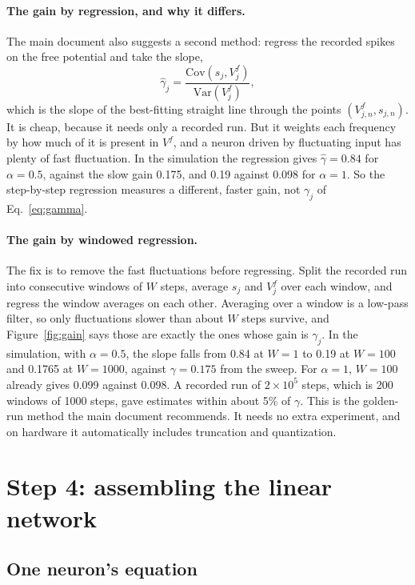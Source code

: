 \documentclass[11pt,a4paper]{article}
\newcommand{\Var}{\mathrm{Var}}
\newcommand{\Cov}{\mathrm{Cov}}
\begin{document}
\paragraph{The gain by regression, and why it differs.} The main document also suggests a second method: regress the recorded spikes on the free potential and take the slope,
\begin{equation*}
\hat\gamma_j = \frac{\Cov(s_j, V^f_j)}{\Var(V^f_j)},
\end{equation*}
which is the slope of the best-fitting straight line through the points $(V^f_{j,n}, s_{j,n})$. It is cheap, because it needs only a recorded run. But it weights each frequency by how much of it is present in $V^f$, and a neuron driven by fluctuating input has plenty of fast fluctuation. In the simulation the regression gives $\hat\gamma = 0.84$ for $\alpha = 0.5$, against the slow gain 0.175, and 0.19 against 0.098 for $\alpha = 1$. So the step-by-step regression measures a different, faster gain, not $\gamma_j$ of Eq.~\eqref{eq:gamma}.

\paragraph{The gain by windowed regression.} The fix is to remove the fast fluctuations before regressing. Split the recorded run into consecutive windows of $W$ steps, average $s_j$ and $V^f_j$ over each window, and regress the window averages on each other. Averaging over a window is a low-pass filter, so only fluctuations slower than about $W$ steps survive, and Figure~\ref{fig:gain} says those are exactly the ones whose gain is $\gamma_j$. In the simulation, with $\alpha = 0.5$, the slope falls from 0.84 at $W = 1$ to 0.19 at $W = 100$ and 0.1765 at $W = 1000$, against $\gamma = 0.175$ from the sweep. For $\alpha = 1$, $W = 100$ already gives 0.099 against 0.098. A recorded run of $2 \times 10^{5}$ steps, which is 200 windows of 1000 steps, gave estimates within about 5\% of $\gamma$. This is the golden-run method the main document recommends. It needs no extra experiment, and on hardware it automatically includes truncation and quantization.

\section{Step 4: assembling the linear network}
\label{sec:assemble}

\subsection{One neuron's equation}
\end{document}
